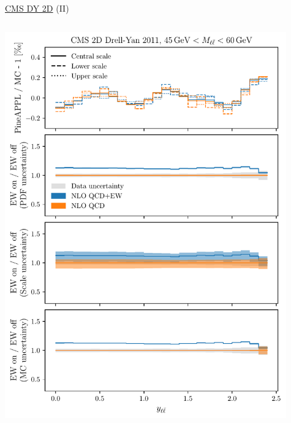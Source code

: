 \begin{frame}{\href{https://arxiv.org/abs/1412.1115}{CMS DY 2D} (II)}
\begin{columns}
\begin{column}{0.5\textwidth}
\includegraphics[width=0.95\textwidth]{ew_corrections/figures/pineappl_CMSDY2D11_bin3}
\end{column}
\begin{column}{0.5\textwidth}

\end{column}
\end{columns}
\end{frame}
